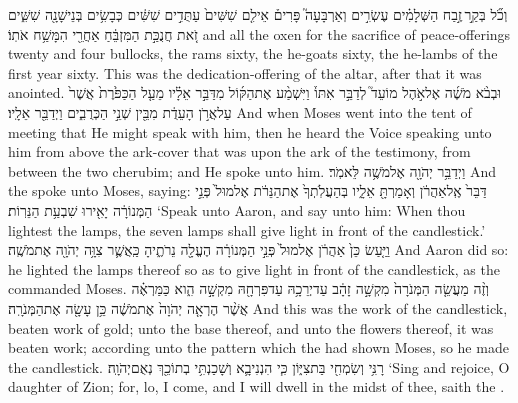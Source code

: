 \documentclass[11pt, openany]{book}
\begin{document}
{וְכֹ֞ל בְּקַ֣ר \legarmeh  זֶ֣בַח הַשְּׁלָמִ֗ים עֶשְׂרִ֣ים וְאַרְבָּעָה֮ פָּרִים֒ אֵילִ֤ם שִׁשִּׁים֙ עַתֻּדִ֣ים שִׁשִּׁ֔ים כְּבָשִׂ֥ים בְּנֵי\maqqaf שָׁנָ֖ה שִׁשִּׁ֑ים זֹ֚את חֲנֻכַּ֣ת הַמִּזְבֵּ֔חַ אַחֲרֵ֖י הִמָּשַׁ֥ח אֹתֽוֹ׃}
{and all the oxen for the sacrifice of peace-offerings twenty and four bullocks, the rams sixty, the he-goats sixty, the he-lambs of the first year sixty. This was the dedication-offering of the altar, after that it was anointed.}
{וּבְבֹ֨א מֹשֶׁ֜ה אֶל\maqqaf אֹ֣הֶל מוֹעֵד֮ לְדַבֵּ֣ר אִתּוֹ֒ וַיִּשְׁמַ֨ע אֶת\maqqaf הַקּ֜וֹל מִדַּבֵּ֣ר אֵלָ֗יו מֵעַ֤ל הַכַּפֹּ֙רֶת֙ אֲשֶׁר֙ עַל\maqqaf אֲרֹ֣ן הָעֵדֻ֔ת מִבֵּ֖ין שְׁנֵ֣י הַכְּרֻבִ֑ים וַיְדַבֵּ֖ר אֵלָֽיו׃ \petucha }
{And when Moses went into the tent of meeting that He might speak with him, then he heard the Voice speaking unto him from above the ark-cover that was upon the ark of the testimony, from between the two cherubim; and He spoke unto him.}
\newperek
{}
{וַיְדַבֵּ֥ר יְהֹוָ֖ה אֶל\maqqaf מֹשֶׁ֥ה לֵּאמֹֽר׃}
{And the \lord\space spoke unto Moses, saying:}
{דַּבֵּר֙ אֶֽל\maqqaf אַהֲרֹ֔ן וְאָמַרְתָּ֖ אֵלָ֑יו בְּהַעֲלֹֽתְךָ֙ אֶת\maqqaf הַנֵּרֹ֔ת אֶל\maqqaf מוּל֙ פְּנֵ֣י הַמְּנוֹרָ֔ה יָאִ֖ירוּ שִׁבְעַ֥ת הַנֵּרֽוֹת׃}
{‘Speak unto Aaron, and say unto him: When thou lightest the lamps, the seven lamps shall give light in front of the candlestick.’}
{וַיַּ֤עַשׂ כֵּן֙ אַהֲרֹ֔ן אֶל\maqqaf מוּל֙ פְּנֵ֣י הַמְּנוֹרָ֔ה הֶעֱלָ֖ה נֵרֹתֶ֑יהָ כַּֽאֲשֶׁ֛ר צִוָּ֥ה יְהֹוָ֖ה אֶת\maqqaf מֹשֶֽׁה׃}
{And Aaron did so: he lighted the lamps thereof so as to give light in front of the candlestick, as the \lord\space commanded Moses.}
{וְזֶ֨ה מַעֲשֵׂ֤ה הַמְּנֹרָה֙ מִקְשָׁ֣ה זָהָ֔ב עַד\maqqaf יְרֵכָ֥הּ עַד\maqqaf פִּרְחָ֖הּ מִקְשָׁ֣ה הִ֑וא כַּמַּרְאֶ֗ה אֲשֶׁ֨ר הֶרְאָ֤ה יְהֹוָה֙ אֶת\maqqaf מֹשֶׁ֔ה כֵּ֥ן עָשָׂ֖ה אֶת\maqqaf הַמְּנֹרָֽה׃ \petucha }
{And this was the work of the candlestick, beaten work of gold; unto the base thereof, and unto the flowers thereof, it was beaten work; according unto the pattern which the \lord\space had shown Moses, so he made the candlestick.}
\label{haft_hanukka1}
\setcounter{chap}{2}
\setcounter{verse}{14}
{רָנִּ֥י וְשִׂמְחִ֖י בַּת\maqqaf צִיּ֑וֹן כִּ֧י הִנְנִי\maqqaf בָ֛א וְשָׁכַנְתִּ֥י בְתוֹכֵ֖ךְ נְאֻם\maqqaf יְהֹוָֽה׃}
{‘Sing and rejoice, O daughter of Zion; for, lo, I come, and I will dwell in the midst of thee, saith the \lord.}
\end{document}
